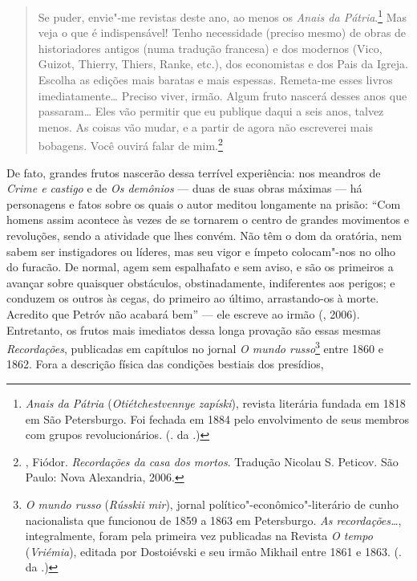 \begin{quotation}
Se puder, envie"-me revistas deste ano, ao menos os \emph{Anais da Pátria}.\footnote{\emph{Anais da Pátria} (\emph{Otiétchestvennye zapíski}), revista literária fundada em 1818 em São Petersburgo. Foi fechada em 1884 pelo envolvimento de seus membros com grupos revolucionários. (. da .)} Mas veja o que é indispensável! Tenho necessidade (preciso mesmo) de obras de historiadores antigos (numa tradução francesa) e dos modernos (Vico, Guizot, Thierry, Thiers, Ranke, etc.), dos economistas e dos Pais da Igreja. Escolha as edições mais baratas e mais espessas. Remeta-me esses livros imediatamente\ldots{} Preciso
viver, irmão. Algum fruto nascerá desses anos que passaram\ldots{} Eles vão permitir que eu publique daqui a seis anos, talvez menos. As coisas vão mudar, e a partir de agora não escreverei mais bobagens. Você ouvirá falar de mim.\footnote{, Fiódor. \emph{Recordações da casa dos mortos}. Tradução Nicolau S. Peticov. São Paulo: Nova Alexandria, 2006.}
\end{quotation}

De fato, grandes frutos nascerão dessa terrível
experiência: nos meandros de \emph{Crime e castigo} e de \emph{Os
demônios} --- duas de suas obras máximas --- há personagens e fatos sobre
os quais o autor meditou longamente na prisão: ``Com homens assim
acontece às vezes de se tornarem o centro de grandes movimentos e
revoluções, sendo a atividade que lhes convém. Não têm o dom da
oratória, nem sabem ser instigadores ou líderes, mas seu vigor e ímpeto
colocam"-nos no olho do furacão. De normal, agem sem espalhafato e sem
aviso, e são os primeiros a avançar sobre quaisquer obstáculos,
obstinadamente, indiferentes aos perigos; e conduzem os outros às cegas,
do primeiro ao último, arrastando-os à morte. Acredito que Petróv não
acabará bem'' --- ele escreve ao irmão (,
2006). Entretanto, os frutos mais imediatos dessa longa provação
são essas mesmas \emph{Recordações}, publicadas em capítulos no
jornal \emph{O mundo russo}\footnote{\emph{O mundo russo}
(\emph{Rússkii mir}), jornal político"-econômico"-literário de
cunho nacionalista que funcionou de 1859 a 1863 em Petersburgo.
\emph{As recordações\ldots{}}, integralmente, foram pela primeira
vez publicadas na Revista \emph{O tempo} (\emph{Vriémia}), editada
por Dostoiévski e seu irmão Mikhail entre 1861 e 1863.
(. da .)} entre 1860 e 1862. Fora a descrição física das
condições bestiais dos presídios,

